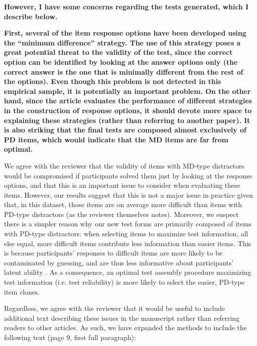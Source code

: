 \documentclass[a4paper,notitlepage,12pt]{article}
\begin{document}
\textbf{However, I have some concerns regarding the tests generated, which I describe below.}


\textbf{First, several of the item response options have been developed using the ``minimum difference'' strategy. The use of this strategy poses a great potential threat to the validity of the test, since the correct option can be identified by looking at the answer options only (the correct answer is the one that is minimally different from the rest of the options). Even though this problem is not detected in this empirical sample, it is potentially an important problem. On the other hand, since the article evaluates the performance of different strategies in the construction of response options, it should devote more space to explaining these strategies (rather than referring to another paper). It is also striking that the final tests are composed almost exclusively of PD items, which would indicate that the MD items are far from optimal.}

We agree with the reviewer that the validity of items with MD-type distractors would be compromised if participants solved them just by looking at the response options, and that this is an important issue to consider when evaluating these items. However, our results suggest that this is not a major issue in practice given that, in this dataset, those items are on average more difficult than items with PD-type distractors (as the reviewer themselves notes). Moreover, we suspect there is a simpler reason why our new test forms are primarily composed of items with PD-type distractors: when selecting items to maximize test information, all else equal, more difficult items contribute less information than easier items. This is because participants' responses to difficult items are more likely to be contaminated by guessing, and are thus less informative about participants' latent ability \cite{lord1968analysis}. As a consequence, an optimal test assembly procedure maximizing test information (i.e. test reliability) is more likely to select the easier, PD-type item clones.

Regardless, we agree with the reviewer that it would be useful to include additional text describing these issues in the manuscript rather than referring readers to other articles. As such, we have expanded the methods to include the following text (page 9, first full paragraph):
\end{document}
